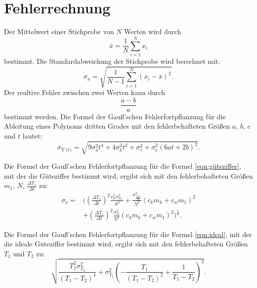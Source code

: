 \section{Fehlerrechnung}
Der Mittelwert einer Stichprobe von $N$ Werten wird durch
\begin{equation*}
    \overline{x} = \frac{1}{N} \sum_{i=1}^N x_i
    \label{eqn:mittelwert}
\end{equation*}
bestimmt.
\newline
Die Standardabweichung der Stichprobe wird berechnet mit:
\begin{equation*}
    \sigma_x = \sqrt{\frac{1}{N-1} \sum_{i=1}^N (x_i - \overline{x})^2}.
    \label{eqn:standard}
\end{equation*}
\newline
Der realtive Fehler zwischen zwei Werten kann durch
\begin{equation*}
    \frac{a-b}{a}
\end{equation*}
bestimmt werden.
\newline
Die Formel der Gauß'schen Fehlerfortpflanzung für die Ableitung eines Polynoms dritten Grades mit den fehlerbehafteten Größen 
 $a$, $b$, $c$ und $t$ lautet:
\begin{equation}
    \sigma_\text{T'(t)} = \sqrt{9 \sigma_{a}^{2} t^{4} + 4 \sigma_{b}^{2} t^{2} + \sigma_{c}^{2} + \sigma_{t}^{2} \left(6 a t + 2 b\right)^{2}}.
    \label{eqn:pol3}
\end{equation}

\noindent Die Formel der Gauß'schen Fehlerfortpflanzung für die Formel \ref{eqn:güteziffer}, mit der die Güteziffer bestimmt wird, ergibt sich mit den fehlerbehafteten Größen 
$m_1$, $N$, $\frac{\Delta T_1}{\Delta t}$ zu:
\begin{equation}
    \begin{split}
        \sigma_{\nu} = {} &\Biggl(\left(\frac{\Delta T_1}{\Delta t}\right)^{2}\frac{c_{w}^{2} \sigma_{m_{1}}^{2}}{N^{2}}  
    + \frac{\sigma_{\frac{\Delta T_1}{\Delta t}}^{2}}{N^{2}} \left(c_{k} m_{k} + c_{w} m_{1}\right)^{2}  \\
    &+\left(\frac{\Delta T_1}{\Delta t}\right)^{2} \frac{\sigma_{N}^{2}}{N^{4}} \left(c_{k} m_{k} + c_{w} m_{1}\right)^{2}\Biggr)^{\frac{1}{2}}.
    \end{split}
\label{eq:gütefehler}
\end{equation}

\noindent Die Formel der Gauß'schen Fehlerfortpflanzung für die Formel \ref{eqn:ideal}, mit der die ideale Güteziffer bestimmt wird, ergibt sich mit den fehlerbehafteten Größen 
$T_1$ und $T_2$ zu:
\begin{equation}
\sqrt{\frac{T_{1}^{2} \sigma_{T_{2}}^{2}}{\left(T_{1} - T_{2}\right)^{4}} + \sigma_{T_{1}}^{2} \left(- \frac{T_{1}}{\left(T_{1} - T_{2}\right)^{2}} + \frac{1}{T_{1} - T_{2}}\right)^{2}}.
    \label{eq:idealFehler}
\end{equation}

